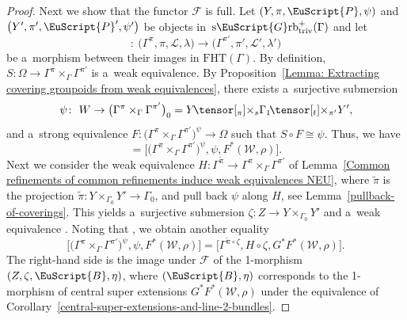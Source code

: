 \documentclass[10pt,a4paper]{amsart}
\numberwithin{equation}{section}
\def\mathscr#1{\EuScript{#1}}
\def\ttimes#1#2{\hspace{-0.15em}\tensor[_{#1}]{\times}{_{#2}}}
\newcommand{\Grbtriv}{\mathscr{G}\mathrm{rb}_{\mathrm{triv}}}
\newcommand{\sGrbtriv}{\mathrm{s}\Grbtriv}
\begin{document}
\begin{proof}
Next we show that the functor $\mathcal{F}$ is full.
 Let $(Y,\pi,\mathscr{P},\psi)$ and $\bigl(Y',\pi',\mathscr{P}',\psi'\bigr)$ be objects in~$\sGrbtriv^{+}(\Gamma)$ and let
\begin{equation*}
 [\Omega,S,\mathcal{W},\rho] \colon\ \bigl(\Gamma^\pi,\pi,\mathcal{L},\lambda\bigr)\to \bigl(\Gamma^{\pi'},{\pi'},\mathcal{L}',\lambda'\bigr)
\end{equation*}
be a~morphism between their images in $\mathrm{FHT}(\Gamma)$. By definition, $S\colon \Omega \to \Gamma^{\pi} \times_\Gamma \Gamma^{\pi'}$ is a~weak equivalence.
By Proposition~\ref{Lemma: Extracting covering groupoids from weak equivalences}, there exists a~surjective submersion
\begin{equation*}
\psi\colon\ W \to \bigl(\Gamma^{\pi} \times_\Gamma \Gamma^{\pi'}\bigr)_0=Y \ttimes{\pi}{s} \Gamma_1 \ttimes{t}{\pi'} Y',
\end{equation*}
and a~strong equivalence $F\colon \bigl(\Gamma^{\pi} \times_\Gamma \Gamma^{\pi'}\bigr)^{\psi} \to \Omega$ such that $S \circ F \cong {\psi}$. Thus, we have
\begin{equation*}
[\Omega,S,\mathcal{W},\rho] = \big[\bigl(\Gamma^{\pi} \times_\Gamma \Gamma^{\pi'}\bigr)^{\psi},{\psi},F^{*}(\mathcal{W},\rho)\big].
\end{equation*}
Next we consider the weak equivalence $H\colon \Gamma^{\tilde\pi} \to \Gamma^{\pi} \times_\Gamma \Gamma^{\pi'}$ of Lemma~\ref{Common refinements of common refinements induce weak equivalences NEU}, where $\tilde\pi$ is the projection $\tilde\pi\colon Y \times_{\Gamma_0} Y' \to \Gamma_0$, and pull back $\psi$ along $H$, see Lemma~\ref{pullback-of-coverings}. This yields a~surjective submersion $\zeta\colon Z \to Y \times_{\Gamma_0} Y'$ and a~weak equivalence . Noting that \smash{$\bigl(\Gamma^{\tilde\pi}\bigr)^{\zeta} = \Gamma^{\tilde\pi \circ \zeta}$}, we obtain another equality
\begin{equation*}
\big[\bigl(\Gamma^{\pi} \times_\Gamma \Gamma^{\pi'}\bigr)^{\psi},{\psi},F^{*}(\mathcal{W},\rho)\big] = \big[\Gamma^{\tilde\pi \circ \zeta},H \circ {\zeta},G^{*}F^{*}(\mathcal{W},\rho)\big].
\end{equation*}
The right-hand side is the image under $\mathcal{F}$ of the 1-morphism $(Z,\zeta,\mathscr{B},\eta)$, where $(\mathscr{B},\eta)$ corresponds to the 1-morphism of central super extensions $G^{*}F^{*}(\mathcal{W},\rho)$ under the equivalence of Corollary~\ref{central-super-extensions-and-line-2-bundles}.


\end{proof}
\end{document}
